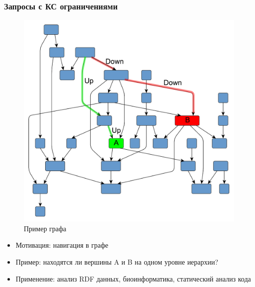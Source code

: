 \documentclass[xcolor=table,english]{beamer}
\begin{document}
\begin{frame}[fragile] \frametitle{Запросы с КС ограничениями}
    \begin{minipage}[m]{0.45\linewidth}
        \begin{figure}
            \centering
            \includegraphics[width=\textwidth]{pictures/hierarchical.pdf}
            \caption{Пример графа}
        \end{figure}
    \end{minipage}\hfill
    \begin{minipage}[m]{0.55\linewidth}
        \begin{itemize}
            \item Мотивация: навигация в графе
            \item Пример: находятся ли вершины A и B на одном уровне иерархии?
            \item Применение: анализ RDF данных, биоинформатика, статический анализ кода
        \end{itemize}
  \end{minipage}
\end{frame}
\end{document}
